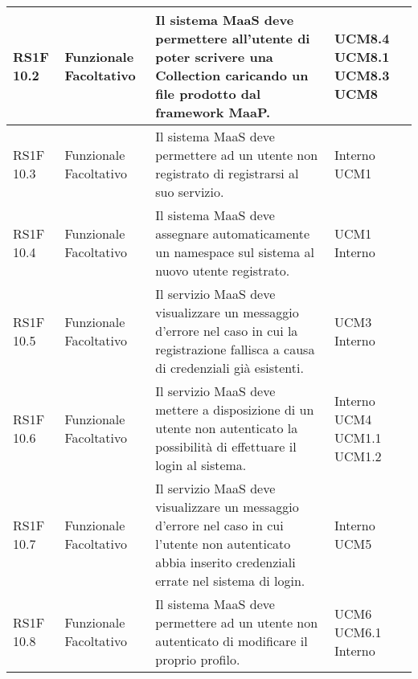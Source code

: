 \begin{center}
\begin{longtable}{ | l | p{2cm} | p{5cm} | p{1.7cm} |}
        RS1F 10.2 & Funzionale \newline  Facoltativo  & Il sistema MaaS deve permettere all'utente di poter scrivere una Collection caricando un file prodotto dal framework MaaP. &  UCM8.4 \newline  UCM8.1 \newline  UCM8.3 \newline  UCM8 \newline  \\ \hline      
        RS1F 10.3 & Funzionale \newline  Facoltativo  & Il sistema MaaS deve permettere ad un utente non registrato di registrarsi al suo servizio. &  Interno \newline  UCM1 \newline  \\ \hline      
        RS1F 10.4 & Funzionale \newline  Facoltativo  & Il sistema MaaS deve assegnare automaticamente un namespace sul sistema al nuovo utente registrato. &  UCM1 \newline  Interno \newline  \\ \hline      
        RS1F 10.5 & Funzionale \newline  Facoltativo  & Il servizio MaaS deve visualizzare un messaggio d'errore nel caso in cui la registrazione fallisca a causa di credenziali già esistenti. &  UCM3 \newline  Interno \newline  \\ \hline      
        RS1F 10.6 & Funzionale \newline  Facoltativo  & Il servizio MaaS deve mettere a disposizione di un utente non autenticato la possibilità di effettuare il login al sistema. &  Interno \newline  UCM4 \newline  UCM1.1 \newline  UCM1.2 \newline  \\ \hline      
        RS1F 10.7 & Funzionale \newline  Facoltativo  & Il servizio MaaS deve visualizzare un messaggio d'errore nel caso in cui l'utente non autenticato abbia inserito credenziali errate nel sistema di login. &  Interno \newline  UCM5 \newline  \\ \hline      
        RS1F 10.8 & Funzionale \newline  Facoltativo  & Il sistema MaaS deve permettere ad un utente non autenticato di modificare il proprio profilo. &  UCM6 \newline  UCM6.1 \newline  Interno \newline  \\ \hline      

\end{longtable}
\end{center}
